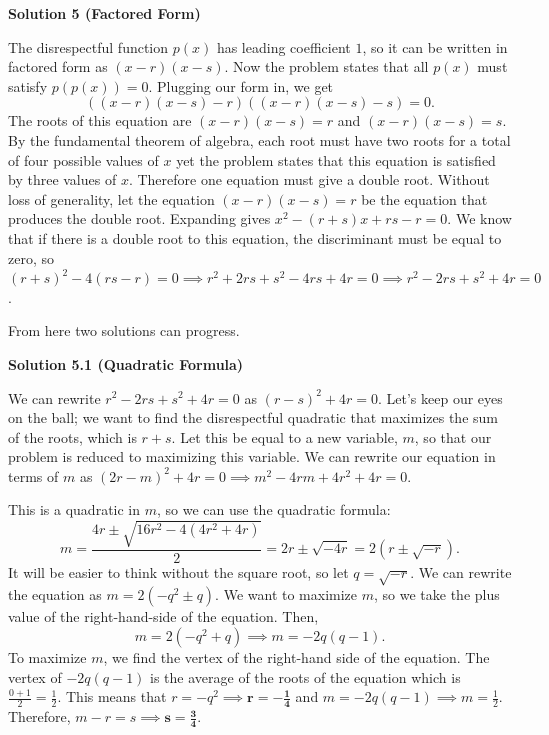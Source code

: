 \begin{enumerate}
 



\textbf{Solution 5 (Factored Form)}

The disrespectful function $p(x)$ has leading coefficient $1$, so it can be written in factored form as $(x-r)(x-s)$. Now the problem states that all $p(x)$ must satisfy $p(p(x)) = 0$. Plugging our form in, we get 
 \[((x-r)(x-s)-r)((x-r)(x-s)-s) = 0.\] The roots of this equation are $(x-r)(x-s) = r$ and $(x-r)(x-s) = s$. By the fundamental theorem of algebra, each root must have two roots for a total of four possible values of $x$ yet the problem states that this equation is satisfied by three values of $x$. Therefore one equation must give a double root. Without loss of generality, let the equation $(x-r)(x-s) = r$ be the equation that produces the double root. Expanding gives $x^2-(r+s)x+rs-r = 0$. We know that if there is a double root to this equation, the discriminant must be equal to zero, so $(r+s)^2-4(rs-r) = 0 \implies r^2+2rs+s^2-4rs+4r = 0 \implies r^2-2rs+s^2+4r = 0$.

 From here two solutions can progress.

 



\textbf{Solution 5.1 (Quadratic Formula)}

We can rewrite $r^2-2rs+s^2+4r = 0$ as $(r-s)^2+4r = 0$. Let's keep our eyes on the ball; we want to find the disrespectful quadratic that maximizes the sum of the roots, which is $r+s$. Let this be equal to a new variable, $m$, so that our problem is reduced to maximizing this variable. We can rewrite our equation in terms of $m$ as $(2r-m)^2 + 4r = 0 \implies m^2- 4rm + 4r^2+4r = 0$. 

 This is a quadratic in $m$, so we can use the quadratic formula: 
 \[m = \frac{4r \pm \sqrt{16r^2-4(4r^2+4r)}}{2} = 2r \pm \sqrt{-4r} = 2\left(r \pm \sqrt{-r}\right).\]It will be easier to think without the square root, so let $q = \sqrt{-r}$. We can rewrite the equation as $m = 2(-q^2 \pm q)$. We want to maximize $m$, so we take the plus value of the right-hand-side of the equation. Then,
 \[m=2(-q^2+q) \implies m = -2q(q-1).\]To maximize $m$, we find the vertex of the right-hand side of the equation. The vertex of $-2q(q-1)$ is the average of the roots of the equation which is $\frac{0+1}{2} = \frac{1}{2}$. This means that $r = -q^2 \implies \boldsymbol{r = -\frac{1}{4}}$ and $m = -2q(q-1) \implies m = \frac{1}{2}$. Therefore, $m-r = s \implies \boldsymbol{s = \frac{3}{4}}$.


\end{enumerate}
